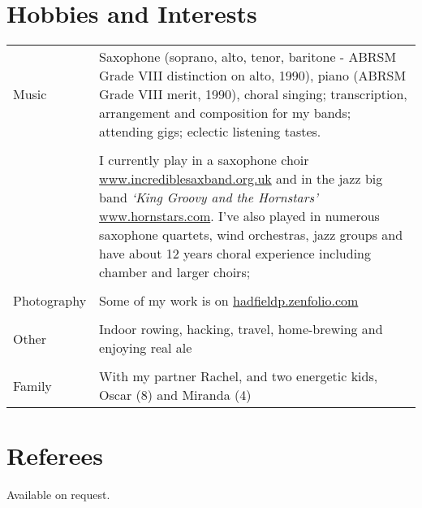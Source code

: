 \documentclass[margin = 0cm,line]{resume}
\begin{document}
\begin{resume}
    \section{\mysidestyle Hobbies and Interests}
    \vspace{1.5mm}
    \begin{table}[ht]
        \begin{tabular}{p{2cm} p{12cm}}
        {Music}&{Saxophone (soprano, alto, tenor, baritone - ABRSM Grade VIII distinction on alto, 1990), piano
	           (ABRSM Grade VIII merit, 1990), choral singing; transcription, arrangement and composition for my bands;
	           attending gigs; eclectic listening tastes.}\\
                                                                                                      \vspace{0.5mm}\\%
		{}&{I currently play in a saxophone choir \url{www.incrediblesaxband.org.uk} and in the jazz big band
		\textsl{`King Groovy and the Hornstars'} \url{www.hornstars.com}.  I've also played in numerous saxophone
		quartets, wind orchestras, jazz groups and have about 12 years choral experience including chamber and larger
		choirs;}\\                                                                                    \vspace{0.5mm}\\%
	    {Photography}&{Some of my work is on \url{hadfieldp.zenfolio.com}}\\
                                                                                                      \vspace{0.5mm}\\%
		{Other}&{Indoor rowing, hacking, travel, home-brewing and enjoying real ale}\\                \vspace{0.5mm}\\%
		{Family}&{With my partner Rachel, and two energetic kids, Oscar (8) and Miranda (4)}\\
        \end{tabular}
    \end{table}
    \section{\mysidestyle Referees} 

    Available on request.

\end{resume}
\end{document}
